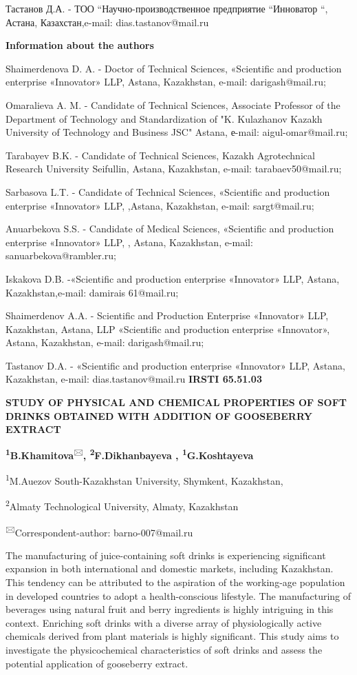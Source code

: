 Тастанов Д.А. - ТОО ``Научно-производственное предприятие ``Инноватор
``, Астана, Казахстан,e-mail: dias.tastanov@mail.ru

{\bfseries Information about the authors}

Shaimerdenova D. A. - Doctor of Technical Sciences, «Scientific and
production enterprise «Innovator» LLP, Astana, Kazakhstan, e-mail:
darigash@mail.ru;

Omaralieva A. M. - Candidate of Technical Sciences, Associate Professor
of the Department of Technology and Standardization of "K. Kulazhanov
Kazakh University of Technology and Business JSC" Astana, е-mail:
aigul-omar@mail.ru;

Tarabayev B.K. - Candidate of Technical Sciences, Kazakh Agrotechnical
Research University Seifullin, Astana, Kazakhstan, e-mail:
tarabaev50@mail.ru;

Sarbasova L.T. - Candidate of Technical Sciences, «Scientific and
production enterprise «Innovator» LLP, ,Astana, Kazakhstan, e-mail:
sargt@mail.ru;

Anuarbekova S.S. - Candidate of Medical Sciences, «Scientific and
production enterprise «Innovator» LLP, , Astana, Kazakhstan, e-mail:
sanuarbekova@rambler.ru;

Iskakova D.B. -«Scientific and production enterprise «Innovator» LLP,
Astana, Kazakhstan,e-mail: damirais 61@mail.ru;

Shaimerdenov A.A. - Scientific and Production Enterprise «Innovator»
LLP, Kazakhstan, Astana, LLP «Scientific and production enterprise
«Innovator», Astana, Kazakhstan, e-mail: darigash@mail.ru;

Tastanov D.A. - «Scientific and production enterprise «Innovator» LLP,
Astana, Kazakhstan, e-mail: dias.tastanov@mail.ru\newpage
{\bfseries IRSTI 65.51.03}

{\bfseries STUDY OF PHYSICAL AND CHEMICAL PROPERTIES OF SOFT DRINKS
OBTAINED WITH ADDITION OF GOOSEBERRY EXTRACT}

{\bfseries \textsuperscript{1}B.Khamitova}\textsuperscript{🖂}{\bfseries ,
\textsuperscript{2}F.Dikhanbayeva , \textsuperscript{1}G.Koshtayeva}

\textsuperscript{1}M.Auezov South-Kazakhstan University, Shymkent,
Kazakhstan,

\textsuperscript{2}Almaty Technological University, Almaty, Kazakhstan

\textsuperscript{🖂}Correspondent-author: barno-007@mail.ru

The manufacturing of juice-containing soft drinks is experiencing
significant expansion in both international and domestic markets,
including Kazakhstan. This tendency can be attributed to the aspiration
of the working-age population in developed countries to adopt a
health-conscious lifestyle. The manufacturing of beverages using natural
fruit and berry ingredients is highly intriguing in this context.
Enriching soft drinks with a diverse array of physiologically active
chemicals derived from plant materials is highly significant. This study
aims to investigate the physicochemical characteristics of soft drinks
and assess the potential application of gooseberry extract.~

